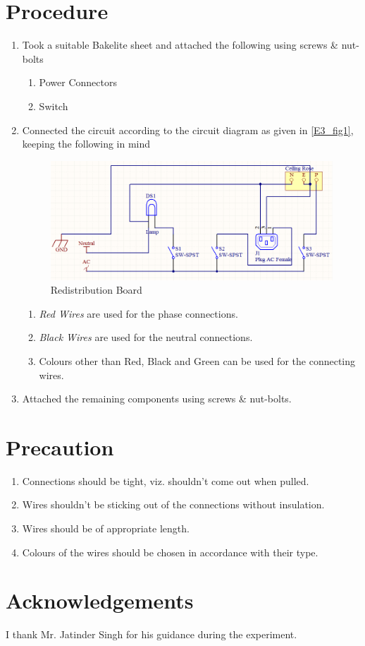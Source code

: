 \section{Procedure}
	\begin{enumerate}
		\item Took a suitable Bakelite sheet and attached the following using screws \& nut-bolts
			\begin{enumerate}
				\item Power Connectors
				\item Switch
			\end{enumerate} 
		\item Connected the circuit according to the circuit diagram as given in \autoref{E3_fig1}, keeping the following in mind
		\begin{figure}[bth]
			\begin{center}
				\includegraphics[width=1.2\linewidth]{gfx/circuit3}
			\end{center}
		\caption[Redistribution Board]{Redistribution Board}\label{E3_fig1}
		\end{figure}


			\begin{enumerate}
				\item \emph{Red Wires} are used for the phase connections.
				\item \emph{Black Wires} are used for the neutral connections.
				\item Colours other than Red, Black and Green can be used for the connecting wires.
			\end{enumerate}	
		\item Attached the remaining components using screws \& nut-bolts.
	\end{enumerate}
\section{Precaution}
	\begin{enumerate}
		\item Connections should be tight, viz. shouldn't come out when pulled.
		\item Wires shouldn't be sticking out of the connections without insulation.
		\item Wires should be of appropriate length.
		\item Colours of the wires should be chosen in accordance with their type.
	\end{enumerate}	
\section{Acknowledgements}
I thank Mr. Jatinder Singh for his guidance during the experiment.